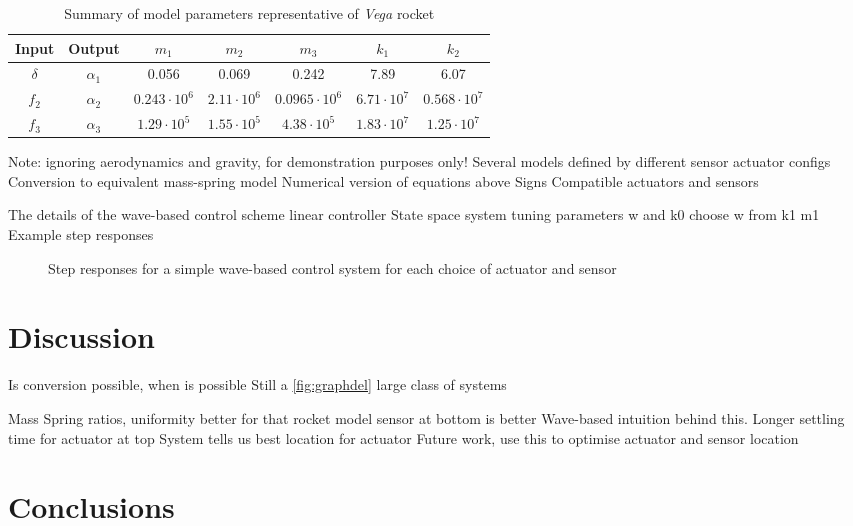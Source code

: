 \documentclass{mbd_fullpaper}
\begin{document}
\renewcommand{\arraystretch}{1.5}
\begin{table}[!ht]
  \begin{center}
    \caption{Summary of model parameters representative of \emph{Vega} rocket \label{tab:modelparam}}
    \vspace{1mm}
    \begin{tabular}{ ccccccc }
	\hline
           Input & Output & $m_1$ & $m_2$ & $m_3$ & $k_1$ & $k_2$ \\
	\hline
      	$\delta$ & $\alpha_1$ & 0.056 & 0.069 & 0.242 & 7.89 & 6.07  \\
      	$f_2$ & $\alpha_2$ & $0.243\cdot 10^6$ & $2.11\cdot 10^6$ & $0.0965\cdot 10^6$ & $6.71\cdot 10^7$ & $0.568\cdot 10^7$ \\
      	$f_3$ & $\alpha_3$ & $1.29\cdot 10^5$ & $1.55\cdot 10^5$ & $4.38\cdot 10^5$ & $1.83\cdot 10^7$ & $1.25\cdot 10^7$ \\
    \end{tabular}
    \label{tab:tab1}
  \end{center}
\end{table}

Note: ignoring aerodynamics and gravity, for demonstration purposes only!
Several models defined by different sensor actuator configs
Conversion to equivalent mass-spring model
Numerical version of equations above
Signs
Compatible actuators and sensors

The details of the wave-based control scheme
linear controller
State space system
tuning parameters w and k0
choose w from k1 m1
Example step responses

\begin{figure}[h]
  \begin{center}
    \subfigure{ \label{fig:graphdel}}   
    \subfigure{ \label{fig:graphf2}}
	\subfigure{ \label{fig:graphf3}}
    \caption{Step responses for a simple wave-based control system for each choice of actuator and sensor \label{fig:graphs}}
  \end{center}
\end{figure}

\section{Discussion}
Is conversion possible, when is possible
Still a \ref{fig:graphdel} large class of systems

Mass Spring ratios, uniformity better
for that rocket model sensor at bottom is better
Wave-based intuition behind this. Longer settling time for actuator at top
System tells us best location for actuator
Future work, use this to optimise actuator and sensor location

\section{Conclusions}




\end{document}
